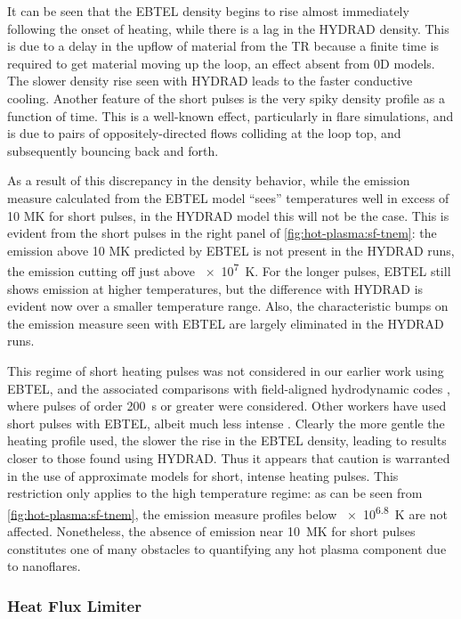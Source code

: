 It can be seen that the EBTEL density begins to rise almost immediately following the onset of heating, while there is a lag in the HYDRAD density. This is due to a delay in the upflow of material from the TR because a finite time is required to get material moving up the loop, an effect absent from 0D models. The slower density rise seen with HYDRAD leads to the faster conductive cooling. Another feature of the short pulses is the very spiky density profile as a function of time. This is a well-known effect, particularly in flare simulations, and is due to pairs of oppositely-directed flows colliding at the loop top, and subsequently bouncing back and forth.

As a result of this discrepancy in the density behavior, while the emission measure calculated from the EBTEL model ``sees'' temperatures well in excess of 10 MK for short pulses, in the HYDRAD model this will not be the case. This is evident from the short pulses in the right panel of \autoref{fig:hot-plasma:sf-tnem}: the emission above 10 MK predicted by EBTEL is not present in the HYDRAD runs, the emission cutting off just above \SI{e7}{\kelvin}. For the longer pulses, EBTEL still shows emission at higher temperatures, but the difference with HYDRAD is evident now over a smaller temperature range. Also, the characteristic bumps on the emission measure seen with EBTEL are largely eliminated in the HYDRAD runs.

This regime of short heating pulses was not considered in our earlier work using EBTEL, and the associated comparisons with field-aligned hydrodynamic codes \citep{klimchuk_highly_2008,cargill_enthalpy-based_2012}, where pulses of order \SI{200}{\second} or greater were considered. Other workers have used short pulses with EBTEL, albeit much less intense \citep{tajfirouze_euv_2016,tajfirouze_time-resolved_2016}. Clearly the more gentle the heating profile used, the slower the rise in the EBTEL density, leading to results closer to those found using HYDRAD. Thus it appears that caution is warranted in the use of approximate models for short, intense heating pulses. This restriction only applies to the high temperature regime: as can be seen from \autoref{fig:hot-plasma:sf-tnem}, the emission measure profiles below \SI{e6.8}{\kelvin} are not affected. Nonetheless, the absence of emission near \SI{10}{\mega\kelvin} for short pulses constitutes one of many obstacles to quantifying any hot plasma component due to nanoflares.

\subsubsection{Heat Flux Limiter}\label{hot-plasma:subsubsec:hf_res}

